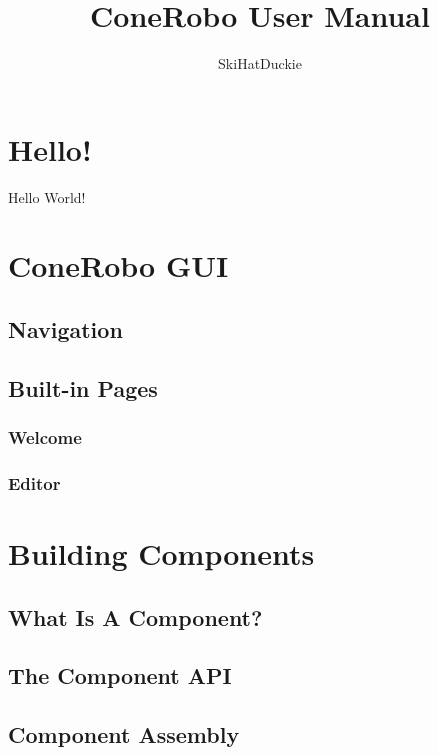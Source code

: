 \documentclass[11pt]{article}
\title{ConeRobo User Manual}
\author{SkiHatDuckie}
\begin{document}
   \maketitle
   \newpage

   \tableofcontents
   \newpage

   \section{Hello!}
   Hello World!

   \section{ConeRobo GUI}
   \subsection{Navigation}
   \subsection{Built-in Pages}
   \subsubsection{Welcome}
   \subsubsection{Editor}

   \section{Building Components}
   \subsection{What Is A Component?}
   \subsection{The Component API}
   \subsection{Component Assembly}
\end{document}
